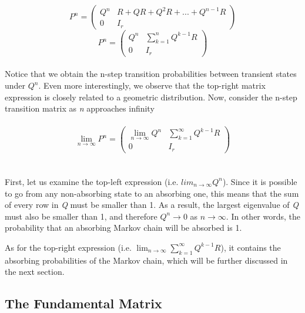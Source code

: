 \documentclass[a4paper, 12pt]{article}
\begin{document}
	 \[
    P^n = \left(
    \begin{array}{c|c}
      Q^n & R + QR + Q^2R + ... + Q^{n-1}R\\
      \hline
      0 & I_r
    \end{array}
    \right)
  \]
  	 \[
    P^n = \left(
    \begin{array}{c|c}
      Q^n & \sum_{k=1}^{n}Q^{k-1}R\\
      \hline
      0 & I_r
    \end{array}
    \right)
  \]
\\
Notice that we obtain the n-step transition probabilities between transient states under $Q^n$. Even more interestingly, we observe that the top-right matrix expression is closely related to a geometric distribution.
Now, consider the n-step transition matrix as \textit{n} approaches infinity
\\
\\
  	 \[
    \lim_{n\to\infty}P^n = \left(
    \begin{array}{c|c}
      \lim_{n\to\infty} Q^n & \sum_{k=1}^{\infty}Q^{k-1}R\\
      \hline
      0 & I_r
    \end{array}
    \right)
  \]
\\
\\
First, let us examine the top-left expression (i.e. $lim_{n\to\infty}Q^n$). Since it is possible to go from any non-absorbing state to an absorbing one, this means that the sum of every row in \textit{Q} must be smaller than 1. As a result, the largest eigenvalue of \textit{Q} must also be smaller than 1, and therefore $Q^n \rightarrow 0$ as $n \rightarrow \infty$. In other words, the probability that an absorbing Markov chain will be absorbed is 1.


As for the top-right expression (i.e. $\lim_{n\to\infty} \sum_{k=1}^{\infty}Q^{k-1}R$), it contains the absorbing probabilities of the Markov chain, which will be further discussed in the next section.

	\subsection*{The Fundamental Matrix}
	
\end{document}
